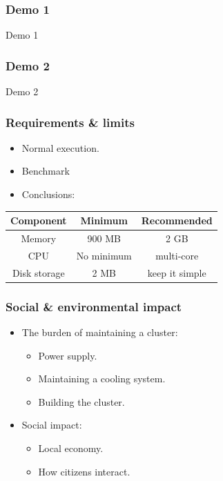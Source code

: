 \documentclass[12pt]{beamer}
\begin{document}
\begin{frame}
\vfill
  \frametitle{Demo 1}
  \begin{center}
    \huge Demo 1
  \end{center}
\vfill
\end{frame}


\begin{frame}
\vfill
  \frametitle{Demo 2}
  \begin{center}
    \huge Demo 2
  \end{center}
\vfill
\end{frame}

\begin{frame}
\vfill
  \frametitle{Requirements \& limits}
  \begin{center}
    \begin{itemize}
      \item Normal execution.
      \item Benchmark
      \item Conclusions:
    \end{itemize}
    \vbox{}
    \begin{tabular}{ | c | c | c | }
      \hline
      Component & Minimum & Recommended \\ \hline
      Memory & 900 MB & 2 GB \\
      CPU & No minimum & multi-core \\
      Disk storage & 2 MB & keep it simple \\ \hline
    \end{tabular}
  \end{center}
\vfill
\end{frame}

\begin{frame}
\vfill
  \frametitle{Social \& environmental impact}
  \begin{itemize}
    \item The burden of maintaining a cluster:
    \vfill
    \begin{itemize}
      \item Power supply.
      \vfill
      \item Maintaining a cooling system.
      \vfill
      \item Building the cluster.
      \vfill
    \end{itemize}
    \vfill
    \item Social impact:
    \vfill
    \begin{itemize}
      \item Local economy.
      \vfill
      \item How citizens interact.
      \vfill
    \end{itemize}

  \end{itemize}
\vfill
\end{frame}
\end{document}
